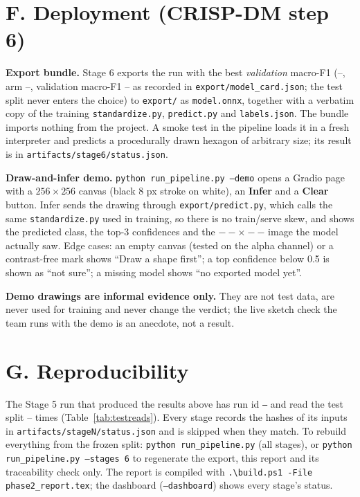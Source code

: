 \documentclass[11pt]{article}
\providecommand{\ImageSize}{--}
\providecommand{\TestReads}{--}
\providecommand{\RunId}{--}
\providecommand{\ExportedRun}{--}
\providecommand{\ExportedArm}{--}
\providecommand{\ExportedValFone}{--}
\begin{document}
\section*{F. Deployment (CRISP-DM step 6)}

\textbf{Export bundle.} Stage 6 exports the run with the best
\emph{validation} macro-F1 (\ExportedRun, arm \ExportedArm, validation
macro-F1 \ExportedValFone{} as recorded in \nolinkurl{export/model_card.json};
the test split never enters the choice) to \nolinkurl{export/} as
\nolinkurl{model.onnx}, together with a verbatim copy of the training
\nolinkurl{standardize.py}, \nolinkurl{predict.py} and \nolinkurl{labels.json}.
The bundle imports nothing from the project. A smoke test in the pipeline
loads it in a fresh interpreter and predicts a procedurally drawn hexagon of
arbitrary size; its result is in \nolinkurl{artifacts/stage6/status.json}.

\textbf{Draw-and-infer demo.} \texttt{python run\_pipeline.py --demo} opens a
Gradio page with a $256{\times}256$ canvas (black 8 px stroke on white),
an \textbf{Infer} and a \textbf{Clear} button. Infer sends the
drawing through \nolinkurl{export/predict.py}, which calls the same
\nolinkurl{standardize.py} used in training, so there is no train/serve skew,
and shows the predicted class, the top-3 confidences and the
$\ImageSize{\times}\ImageSize$ image the model actually saw. Edge cases: an
empty canvas (tested on the alpha channel) or a contrast-free mark shows
``Draw a shape first''; a top confidence below 0.5 is shown as ``not sure'';
a missing model shows ``no exported model yet''.

\textbf{Demo drawings are informal evidence only.} They are not test data,
are never used for training and never change the verdict; the live sketch
check the team runs with the demo is an anecdote, not a result.

\section*{G. Reproducibility}

The Stage 5 run that produced the results above has run id \texttt{\RunId}
and read the test split \TestReads{} times (Table~\ref{tab:testreads}). Every
stage records the hashes of its inputs in \nolinkurl{artifacts/stageN/status.json}
and is skipped when they match. To rebuild everything from the frozen split:
\texttt{python run\_pipeline.py} (all stages), or
\texttt{python run\_pipeline.py --stages 6} to regenerate the export, this
report and its traceability check only. The report is compiled with
\texttt{.\textbackslash build.ps1 -File phase2\_report.tex}; the dashboard
(\texttt{--dashboard}) shows every stage's status.
\end{document}
